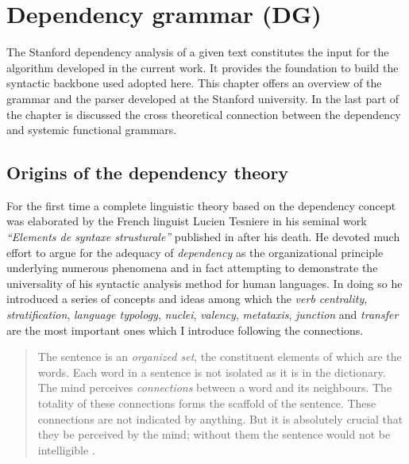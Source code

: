 \chapter{Dependency grammar (DG)}
\label{ch:dependency-grammar}

The Stanford dependency analysis of a given text constitutes the input for the algorithm developed in the current work. It provides the foundation to build the syntactic backbone used adopted here. This chapter offers an overview of the grammar and the parser developed at the Stanford university. In the last part of the chapter is discussed the cross theoretical connection between the dependency and systemic functional grammars. 

\section{Origins of the dependency theory}
\label{sec:origins}
For the first time a complete linguistic theory based on the dependency concept was elaborated by the French linguist Lucien Tesniere in his seminal work \textit{``Elements de syntaxe strusturale''} published in \citeyear{Tesniere59} after his death. He devoted much effort to argue for the adequacy of \textit{dependency} as the organizational principle underlying numerous phenomena and in fact attempting to demonstrate the universality of his syntactic analysis method for human languages. In doing so he introduced a series of concepts and ideas among which the \textit{verb centrality}, \textit{stratification}, \textit{language typology}, \textit{nuclei}, \textit{valency}, \textit{metataxis}, \textit{junction} and \textit{transfer} are the most important ones which I introduce following the connections.


\begin{quotation}
    The sentence is an \textit{organized set}, the constituent elements of which are the words. Each word in a sentence is not isolated as it is in the dictionary. The mind perceives \textit{connections} between a word and its neighbours. The totality of these connections forms the scaffold of the sentence. These connections are not indicated by anything. But it is absolutely crucial that they be perceived by the mind; without them the sentence would not be intelligible \citep[3]{Tesniere2015}.
\end{quotation}

